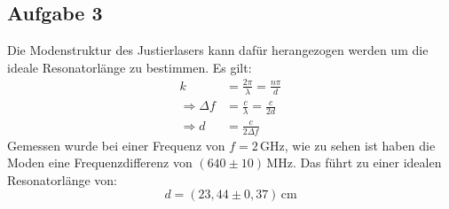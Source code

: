 \subsection{Aufgabe 3}
Die Modenstruktur des Justierlasers kann dafür herangezogen werden um die ideale Resonatorlänge zu bestimmen. Es gilt:
\begin{align}
k &= \frac{2\pi}{\lambda}  = \frac{n\pi}{d} \\
\Rightarrow \Delta f &= \frac{c}{\lambda} = \frac{c}{2d} \\
\Rightarrow d &= \frac{c}{2\Delta f}
\end{align}
Gemessen wurde bei einer Frequenz von $f = 2\, \text{GHz}$, wie zu sehen ist haben die Moden eine Frequenzdifferenz von $(640 \pm 10)\, \text{MHz}$. Das führt zu einer idealen Resonatorlänge von:
\begin{equation}
d = (23,44 \pm 0,37)\, \text{cm}
\end{equation}
